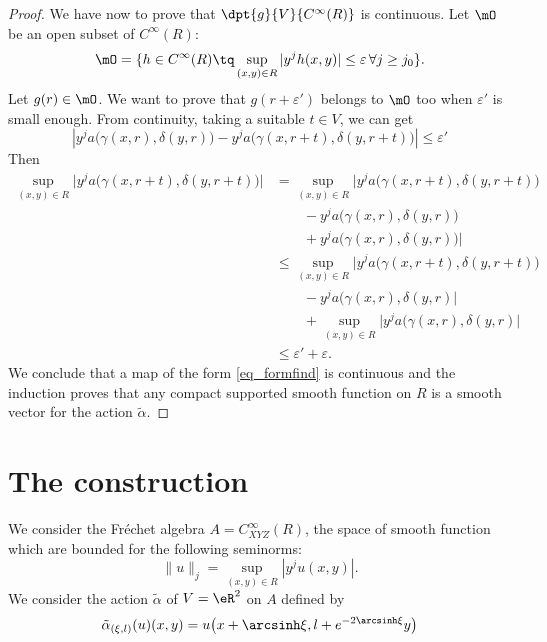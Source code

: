\begin{proof}
	We have now to prove that $\dpt{ g }{ V }{  C^{\infty}(R) }$ is continuous. Let $\mO$ be an open subset of $ C^{\infty}(R)$:
	\[
		\mO=\{ h\in C^{\infty}(R)\tq \sup_{(x,y)\in R}| y^jh(x,y)  |\leq\varepsilon\,\forall j\geq j_0 \}.
	\]
	Let $g(r)\in\mO$. We want to prove that $g(r+\varepsilon')$ belongs to $\mO$ too when $\varepsilon'$ is small enough. From continuity, taking a suitable $t\in V$, we can get
	\[
		\left| y^ja\big( \gamma(x,r),\delta(y,r) \big)-y^ja\big( \gamma(x,r+t),\delta(y,r+t) \big) \right|\leq\varepsilon'
	\]
	Then
	\begin{equation}
		\begin{split}
			\sup_{(x,y)\in R}\Big|  y^ja\big( \gamma(x,r+t),\delta(y,r+t) \big)   \Big|&=
			\sup_{(x,y)\in R}\Big|   y^ja\big( \gamma(x,r+t),\delta(y,r+t) \big)\\
			&\qquad-y^ja\big( \gamma(x,r),\delta(y,r) \big)\\
			&\qquad+ y^ja\big( \gamma(x,r),\delta(y,r) \big) \Big|\\
			&\leq \sup_{(x,y)\in R}\Big|  y^ja\big( \gamma(x,r+t),\delta(y,r+t) \big)\\
			&\qquad  - y^ja\big( \gamma(x,r),\delta(y,r)  \Big|\\
			&\qquad + \sup_{(x,y)\in R}\Big|   y^ja\big( \gamma(x,r),\delta(y,r)  \Big|\\
			&\leq\varepsilon'+\varepsilon.
		\end{split}
	\end{equation}
	We conclude that a map of the form \eqref{eq_formfind}  is continuous and the induction proves that any compact supported smooth function on $R$ is a smooth vector for the action $\tilde\alpha$.


\end{proof}


%
\section{The construction}
%

We consider the Fréchet algebra $A= C^{\infty}_{XYZ}(R)$, the space of smooth function which are bounded for the following seminorms:
\begin{equation}
	\| u \|_j=\sup_{(x,y)\in R}| y^j u(x,y) |.
\end{equation}
We consider the action $\tilde\alpha$ of $V=\eR^2$ on $A$ defined by
\begin{equation}
	\tilde\alpha_{(\xi,l)}(u)(x,y)=u\big( x+\arcsinh\xi,l+e^{-2\arcsinh\xi}y \big)
\end{equation}


